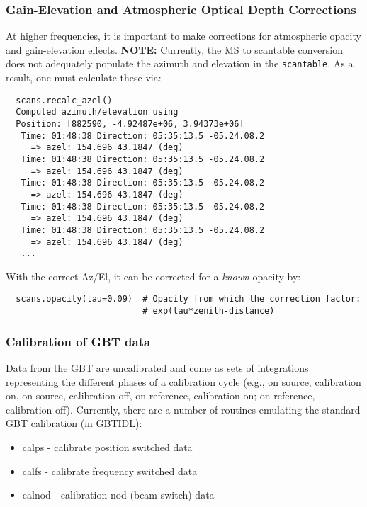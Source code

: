 \subsubsection{Gain-Elevation and Atmospheric Optical Depth Corrections}
\label{subsubsection:sd.asap.calib.gain}

At higher frequencies, it is important to make corrections for
atmospheric opacity and gain-elevation effects. {\bf NOTE:} Currently,
the MS to scantable conversion does not adequately populate the
azimuth and elevation in the {\tt scantable}. As a result, one must
calculate these via:

\small
\begin{verbatim}
  scans.recalc_azel()
  Computed azimuth/elevation using 
  Position: [882590, -4.92487e+06, 3.94373e+06]
   Time: 01:48:38 Direction: 05:35:13.5 -05.24.08.2
     => azel: 154.696 43.1847 (deg)
   Time: 01:48:38 Direction: 05:35:13.5 -05.24.08.2
     => azel: 154.696 43.1847 (deg)
   Time: 01:48:38 Direction: 05:35:13.5 -05.24.08.2
     => azel: 154.696 43.1847 (deg)
   Time: 01:48:38 Direction: 05:35:13.5 -05.24.08.2
     => azel: 154.696 43.1847 (deg)
   Time: 01:48:38 Direction: 05:35:13.5 -05.24.08.2
     => azel: 154.696 43.1847 (deg)
   ...
\end{verbatim}
\normalsize


With the correct Az/El, it can be corrected for a {\it known}
opacity by:

\small
\begin{verbatim}
  scans.opacity(tau=0.09)  # Opacity from which the correction factor: 
                           # exp(tau*zenith-distance)
\end{verbatim}
\normalsize


\subsubsection{Calibration of GBT data}
\label{subsubsection:sd.asap.calib.gbt}

Data from the GBT are uncalibrated and come as sets of integrations
representing the different phases of a calibration cycle (e.g., on
source, calibration on, on source, calibration off, on reference,
calibration on; on reference, calibration off). Currently, there are a
number of routines emulating the standard GBT calibration (in GBTIDL):
\begin{itemize}
   \item calps - calibrate position switched data
   \item calfs - calibrate frequency switched data
   \item calnod - calibration nod (beam switch) data
\end{itemize}

